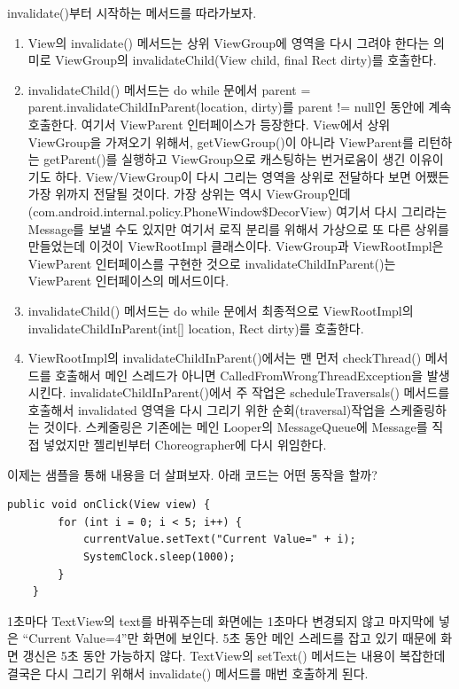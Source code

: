 invalidate()부터 시작하는 메서드를 따라가보자.
\begin{enumerate}
\item View의 invalidate() 메서드는 상위 ViewGroup에 영역을 다시 그려야 한다는 의미로 ViewGroup의 invalidateChild(View child, final Rect dirty)를 호출한다. 

\item invalidateChild() 메서드는 do while 문에서 parent = parent.invalidateChildInParent(location, dirty)를 parent != null인 동안에 계속 호출한다. 
여기서 ViewParent 인터페이스가 등장한다. 
View에서 상위 ViewGroup을 가져오기 위해서, getViewGroup()이 아니라 ViewParent를 리턴하는 getParent()를 실행하고 ViewGroup으로 캐스팅하는 번거로움이 생긴 이유이기도 하다. 
View/ViewGroup이 다시 그리는 영역을 상위로 전달하다 보면 어쨌든 가장 위까지 전달될 것이다. 
가장 상위는 역시 ViewGroup인데(com.android.internal.policy.PhoneWindow\$Deco\-rView) 여기서 다시 그리라는 Message를 보낼 수도 있지만 여기서 로직 분리를 위해서 가상으로 또 다른 상위를 만들었는데 이것이 ViewRootImpl 클래스이다.
ViewGroup과 ViewRootImpl은 ViewParent 인터페이스를 구현한 것으로 invalidateChildInParent()는 ViewParent 인터페이스의 메서드이다.

\item invalidateChild() 메서드는 do while 문에서 최종적으로 ViewRootImpl의 invalidateChildInParent(int[] location, Rect dirty)를 호출한다.

\item ViewRootImpl의 invalidateChildInParent()에서는 맨 먼저 checkThread() 메서드를 호출해서 메인 스레드가 아니면 CalledFromWrongThreadException을 발생시킨다.
invalidateChildInParent()에서 주 작업은 scheduleTraversals() 메서드를 호출해서 invalidated 영역을 다시 그리기 위한 순회(traversal)작업을 스케줄링하는 것이다. 
스케줄링은 기존에는 메인 Looper의 MessageQueue에 Message를 직접 넣었지만 젤리빈부터 Choreographer에 다시 위임한다.
\end{enumerate}

이제는 샘플을 통해 내용을 더 살펴보자. 아래 코드는 어떤 동작을 할까?
\begin{lstlisting}[frame=single] 
	public void onClick(View view) {
		for (int i = 0; i < 5; i++) {
			currentValue.setText("Current Value=" + i);
			SystemClock.sleep(1000);
		}
	}
\end{lstlisting}
1초마다 TextView의 text를 바꿔주는데 화면에는 1초마다 변경되지 않고 마지막에 넣은 ``Current Value=4''만 화면에 보인다.
5초 동안 메인 스레드를 잡고 있기 때문에 화면 갱신은 5초 동안 가능하지 않다. 
TextView의 setText() 메서드는 내용이 복잡한데 결국은 다시 그리기 위해서 invalidate() 메서드를 매번 호출하게 된다.\\

